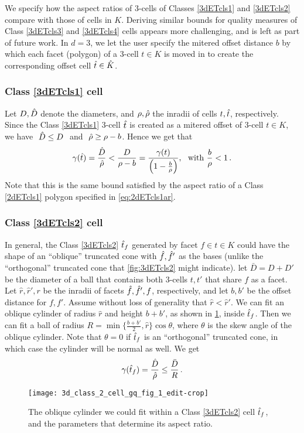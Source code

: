 We specify how the aspect ratios of $3$-cells of Classes \ref{3dETcls1} and \ref{3dETcls2} compare with those of cells in $K$.
Deriving similar bounds for quality measures of Class \ref{3dETcls3} and \ref{3dETcls4} cells appears more challenging, and is left as part of future work.
In $d=3$, we let the user specify the mitered offset distance $b$ by which each facet (polygon) of a $3$-cell $t \in K$ is moved in to create the corresponding offset cell $\hat{t} \in \hat{K}$.

\subsubsection{Class \ref{3dETcls1} cell}
Let $D, \hat{D}$ denote the diameters, and $\rho, \hat{\rho}$ the inradii of cells $t, \hat{t}$, respectively.
Since the Class \ref{3dETcls1} $3$-cell $\hat{t}$ is created as a mitered offset of $3$-cell $t \in K$, we have $~\hat{D} \leq D~$ and $~\hat{\rho} \geq \rho - b$.
Hence we get that
\[
\gamma(\hat{t}) = \frac{\hat{D}}{\hat{\rho}} < \frac{D}{\rho - b} = \frac{\gamma(t)}{\left( 1 - \frac{b}{\rho}\right)}, ~\mbox{ with } \frac{b}{\rho} < 1 \, .
\]
Note that this is the same bound satisfied by the aspect ratio of a Class \ref{2dETcls1} polygon specified in \cref{eq:2dETcls1ar}.
\subsubsection{Class \ref{3dETcls2} cell}
In general, the Class \ref{3dETcls2} $\hat{t}_f$ generated by facet $f \in t \in K$ could have the shape of an ``oblique'' truncated cone with $\hat{f},\hat{f}'$ as the bases (unlike the ``orthogonal'' truncated cone that \cref{fig:3dETcls2} might indicate).
let $\bar{D}=D+D'$ be the diameter of a ball that contains both $3$-cells $t,t'$ that share $f$ as a facet.
Let $\hat{r}, \hat{r}', r$ be the inradii  of facets $\hat{f}, \hat{f}', f$, respectively, and let $b, b'$ be the offset distance for $f, f'$.
Assume without loss of generality that $\hat{r} < \hat{r}'$.
We can fit an oblique cylinder of radius $\hat{r}$ and height $b + b'$, as shown in \cref{fig:3dETcls2gq}, inside $\hat{t}_f$.
Then we can fit a ball of radius $R = \min\{ \frac{b+b'}{2}, \hat{r}\} \cos{\theta}$, where $\theta$ is the skew angle of the oblique cylinder.
Note that $\theta = 0$ if $\hat{t}_f$ is an ``orthogonal'' truncated cone, in which case the cylinder will be normal as well.
We get
\[\gamma(\hat{t}_f) = \frac{\hat{D}}{\hat{\rho}} \leq \frac{\bar{D}}{R} \,.\]
\begin{figure}[htp!]
      \centering
      \texttt{[image: 3d\_class\_2\_cell\_gq\_fig\_1\_edit-crop]}
      \caption{The oblique cylinder we could fit within a Class \ref{3dETcls2} cell $\hat{t}_f$, and the parameters that determine its aspect ratio.
      }
      \label{fig:3dETcls2gq}
\end{figure}




